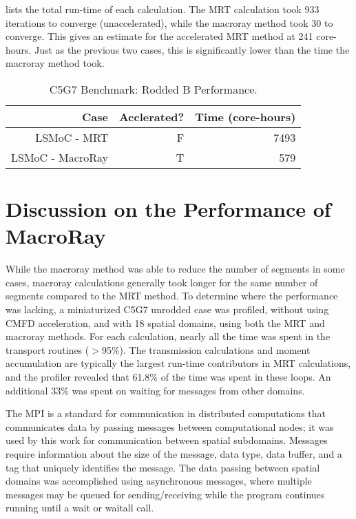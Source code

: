 {{{{         lists the total run-time of each calculation.
        The \ac{MRT} calculation took 933 iterations to converge (unaccelerated), while the macroray method took 30 to converge.
        This gives an estimate for the accelerated \ac{MRT} method at 241 core-hours.
        Just as the previous two cases, this is significantly lower than the time the macroray method took.

        \begin{table}[htbp]
          \centering
          \caption{C5G7 Benchmark: Rodded B Performance. \label{tab:MR:C5G7:Rodded B-Performance}}
          \begin{tabular}{rrr}\toprule
            Case                        & Acclerated? & Time (core-hours)\\\midrule
            LSMoC - MRT                 & F & 7493\\
            LSMoC - MacroRay            & T & 579\\\bottomrule
          \end{tabular}
        \end{table}
      }
    }
  }

  \section{Discussion on the Performance of MacroRay}{\label{sec:Discussion one the Performance of MacroRay}
    While the macroray method was able to reduce the number of segments in some cases, macroray calculations generally took longer for the same number of segments compared to the \ac{MRT} method.
    To determine where the performance was lacking, a miniaturized C5G7 unrodded case was profiled, without using \ac{CMFD} acceleration, and with 18 spatial domains, using both the \ac{MRT} and macroray methods.
    For each calculation, nearly all the time was spent in the transport routines ($>$95\%).
    The transmission calculations and moment accumulation are typically the largest run-time contributors in \ac{MRT} calculations, and the profiler revealed that 61.8\% of the time was spent in these loops.
    An additional 33\% was spent on waiting for messages from other domains.

    The \acf{MPI} \cite{MPI} is a standard for communication in distributed computations that communicates data by passing messages between computational nodes; it was used by this work for communication between spatial subdomains.
    Messages require information about the size of the message, data type, data buffer, and a tag that uniquely identifies the message.
    The data passing between spatial domains was accomplished using asynchronous messages, where multiple messages may be queued for sending/receiving while the program continues running until a wait or waitall call.

}}
